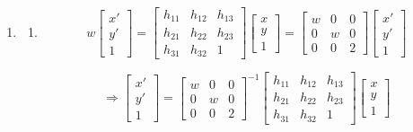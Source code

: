 \documentclass[12pt]{article}
\begin{document}
	\begin{enumerate}
		\item 
		\begin{enumerate}
			\item $$w\begin{bmatrix}
			x'\\y'\\1
			\end{bmatrix}=\begin{bmatrix}
			h_{11} & h_{12} & h_{13}\\
			h_{21} & h_{22} & h_{23}\\
			h_{31} & h_{32} & 1
			\end{bmatrix}\begin{bmatrix}
			x\\y\\1
			\end{bmatrix}=\begin{bmatrix}
			w & 0 & 0\\
			0 & w & 0\\  
			0 & 0 & 2
			\end{bmatrix}\begin{bmatrix}
			x'\\y'\\1
			\end{bmatrix}$$
			
			$$\Rightarrow\begin{bmatrix}
			x'\\y'\\1
			\end{bmatrix}=\begin{bmatrix}
			w & 0 & 0\\
			0 & w & 0\\  
			0 & 0 & 2
			\end{bmatrix}^{-1}\begin{bmatrix}
			h_{11} & h_{12} & h_{13}\\
			h_{21} & h_{22} & h_{23}\\
			h_{31} & h_{32} & 1
			\end{bmatrix}\begin{bmatrix}
			x\\y\\1
			\end{bmatrix}$$
			

\end{enumerate}
\end{enumerate}
\end{document}
